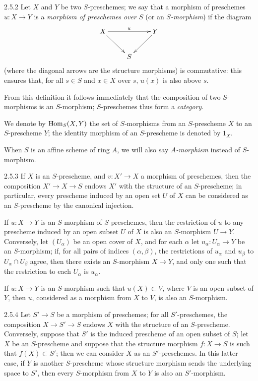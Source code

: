 \documentclass{book}
\begin{document}
\begin{env}{2.5.2}
\label{env-1.2.5.2}
Let $X$ and $Y$ be two $S$-preschemes; we say that a morphism
of preschemes $u\colon X\to Y$ is a \emph{morphism of preschemes over $S$} (or
an \emph{$S$-morphism}) if the diagram
\[
  \xymatrix{
    X \ar[rr]^u \ar[dr] & & Y\ar[dl]\\
    & S &
  }
\]
(where the diagonal arrows are the structure morphisms) is
commutative: this ensures that, for all $s\in S$ and $x\in X$ over $s$, $u(x)$
is also above $s$.
\end{env}

From this definition it follows immediately that the composition of two
$S$-morphisms is an $S$-morphism; $S$-preschemes thus form a \emph{category}.

We denote by ${\mathop{\mathrm{Hom}}\nolimits}_S(X,Y)$ the set of $S$-morphisms from an $S$-prescheme $X$ to
an $S$-prescheme $Y$; the identity morphism of an $S$-prescheme is denoted by
$1_X$.

When $S$ is an affine scheme of ring $A$, we will also say \emph{$A$-morphism}
instead of $S$-morphism.

\begin{env}{2.5.3}
\label{env-1.2.5.3}
If $X$ is an $S$-prescheme, and $v\colon X'\to X$ a morphism of preschemes,
then the composition $X'\to X\to S$ endows $X'$ with the structure of an $S$-prescheme;
in particular, every prescheme induced by an open set $U$ of $X$ can be considered as an
$S$-prescheme by the canonical injection.
\end{env}

If $u\colon X\to Y$ is an $S$-morphism of $S$-preschemes, then the restriction
of $u$ to any prescheme induced by an open subset $U$ of $X$ is also an
$S$-morphism $U\to Y$. Conversely, let $(U_\alpha)$ be an open cover of $X$,
and for each $\alpha$ let $u_\alpha\colon U_\alpha\to Y$ be an $S$-morphism; if,
for all pairs of indices $(\alpha,\beta)$, the restrictions of $u_\alpha$ and
$u_\beta$ to $U_\alpha\cap U_\beta$ agree, then there exists an $S$-morphism
$X\to Y$, and only one such that the restriction to each $U_\alpha$ is
$u_\alpha$.

If $u\colon X\to Y$ is an $S$-morphism such that $u(X)\subset V$, where $V$ is
an open subset of $Y$, then $u$, considered as a morphism from $X$ to $V$, is
also an $S$-morphism.

\begin{env}{2.5.4}
\label{env-1.2.5.4}
Let $S'\to S$ be a morphism of preschemes; for all
$S'$-preschemes, the composition $X\to S'\to S$ endows $X$ with the structure of
an $S$-prescheme. Conversely, suppose that $S'$ is the induced prescheme of an
open subset of $S$; let $X$ be an $S$-prescheme and suppose that the structure
morphism $f\colon X\to S$ is such that $f(X)\subset S'$; then we can consider
$X$ as an $S'$-preschemes. In this latter case, if $Y$ is another $S$-prescheme
whose structure morphism sends the underlying space to $S'$, then every
$S$-morphism from $X$ to $Y$ is also an $S'$-morphism.
\end{env}
\end{document}
